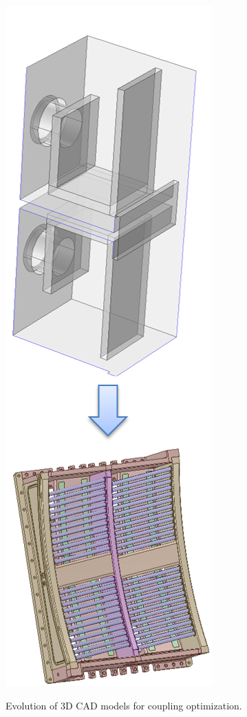 \begin{marginfigure}[+1.2cm]
	\centering
	\includegraphics[width=0.8\linewidth]{figures/chap3/WEST_ICRH/WEST_front_face_evolution2}
	\caption{Evolution of 3D CAD models for coupling optimization.}
	\label{fig:westfrontfaceevolution2}
\end{marginfigure}

